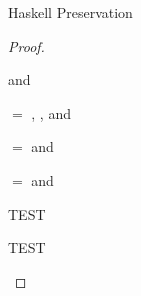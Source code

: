 \begin{theorem}{Haskell Preservation}
\begin{proof}
\begin{case}{\ostlnil}
\end{case}


\begin{case}{\oshdconsh}

\pnpremise
{\judeh{\env}{\oshdconslh}{\first{\vartyh}}}
\pntypes
{
\judeh{\env}{\expcons{\first{\varexph}}{\second{\varexph}}}{\tylist{\first{\vartyh}}} and
\judeh{\env}{\oshdconsrh}{\first{\vartyh}}
}

\end{case}


\begin{case}{\ostlconsh}

\pnpremise
{\judeh{\env}{\ostlconslh}{\first{\vartyh}}}
\pntypes
{
\first{\vartyh} $=$ \tylist{\second{\vartyh}},
\judeh{\env}{\expcons{\first{\varexph}}{\second{\varexph}}}{\tylist{\second{\vartyh}}}, and
\judeh{\env}{\ostlconsrh}{\tylist{\second{\vartyh}}}
}

\end{case}


\begin{case}{\osnullnil}

\pnpremise
{\judeh{\env}{\osnullnill}{\first{\vartyh}}}
\pntypes
{
\first{\vartyh} $=$ \tynum and
\judeh{}{\osnullnilr}{\tynum}
}

\end{case}


\begin{case}{\osnullconsh}

\pnpremise
{\judeh{\env}{\osnullconslh}{\first{\vartyh}}}
\pntypes
{
\first{\vartyh} $=$ \tynum and
\judeh{}{\osnullconsrh}{\tynum}
}

\end{case}


\begin{case}{\oshmmheq}

TEST

\end{case}


\begin{case}{\redruleh{\oshmmhneql}{\oshmmhneqr} \oshmmhneqn}

TEST

\end{case}


\end{proof}
\end{theorem}
